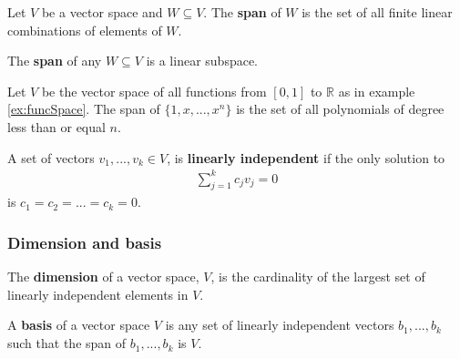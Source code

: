 \documentclass[compress]{beamer}
\def\R{\mathbb{R}}
\theoremstyle{definition}
\begin{document}
\begin{frame}
  \begin{definition}
    Let $V$ be a vector space and $W \subseteq V$. The
    \textbf{span} of $W$ is the set
    of all finite linear combinations of elements of $W$.
  \end{definition}

  \begin{lemma}
    The \textbf{span} of any  $W \subseteq V$ is a linear subspace.
  \end{lemma}
\end{frame}


\begin{frame}
  \begin{example}
    Let $V$ be the vector space of all functions from $[0,1]$ to $\R$ as
    in example \ref{ex:funcSpace}. The span of $\{1, x, ..., x^n\}$ is
    the set of all polynomials of degree less than or equal $n$.
  \end{example}
\end{frame}

\begin{frame}
  \begin{definition}
    A set of vectors $v_1, ..., v_k \in V$, is \textbf{linearly
      independent} if the only solution to
    \begin{align*}
      \sum_{j=1}^k c_j v_j = 0 
    \end{align*}
    is $c_1 = c_2 = ... = c_k = 0$. 
  \end{definition}
\end{frame}

\subsubsection{Dimension and basis}

\begin{frame}
  \begin{definition}
    The \textbf{dimension} of a vector space, $V$, is the cardinality of
    the largest set of linearly independent elements in $V$.
  \end{definition} 
  
  \begin{definition}
    A \textbf{basis} of a vector space $V$ is any set of linearly
    independent vectors $b_1, ..., b_k$ such that the span of $b_1, ...,
    b_k$ is $V$.
  \end{definition}
\end{frame}
\end{document}
